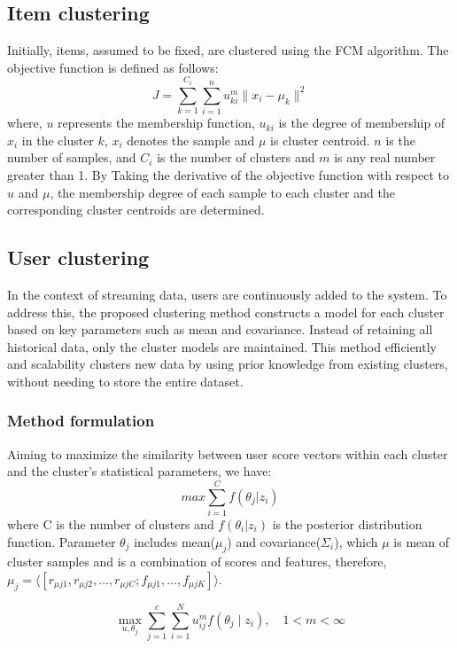 \documentclass{article}
\begin{document}
\subsection{Item clustering}
Initially, items, assumed to be fixed, are clustered using the FCM algorithm. The objective function is defined as follows:
\begin{equation}
    J = \sum_{k=1}^{C_i} \sum_{i=1}^{n} u_{ki}^m \| x_i - \mu_k \|^2
\end{equation}
where, $u$ represents the membership function, $u_{ki}$ is the degree of membership of $x_i$ in the cluster $k$, $x_i$ denotes the sample and $\mu$ is cluster centroid. $n$ is the number of samples, and ${C_i}$ is the number of clusters and $m$ is any real number greater than 1. By Taking the derivative of the objective function with respect to $u$ and $\mu$, the membership degree of each sample to each cluster and the corresponding cluster centroids are determined.
\subsection{User clustering}
In the context of streaming data, users are continuously added to the system. To address this, the proposed clustering method constructs a model for each cluster based on key parameters such as mean and covariance. Instead of retaining all historical data, only the cluster models are maintained. This method efficiently and scalability clusters new data by using prior knowledge from existing clusters, without needing to store the entire dataset.

\subsubsection{Method formulation}

Aiming to maximize the similarity between user score vectors within each cluster and the cluster's statistical parameters, we have:
\begin{equation}
    max \sum_{i=1}^{C} f(\theta_j| z_i)
\end{equation}
where C is the number of clusters and $f(\theta_i|z_i)$ is the posterior distribution function. Parameter $\theta_j$ includes mean($\mu_j$) and covariance($\Sigma_i$), which $\mu$ is mean of cluster samples and is a combination of scores and features, therefore, $\mu_j = \langle [r_{\mu j1}, r_{\mu j2}, \ldots, r_{\mu jC}; f_{\mu j1}, \ldots, f_{\mu jK}] \rangle $.

\begin{equation}\label{eq:first}
    \max_{u, \theta_j} \sum_{j=1}^{c} \sum_{i=1}^{N} u_{ij}^{m} f(\theta_j \mid z_i), \quad 1 < m < \infty
\end{equation}
\end{document}
